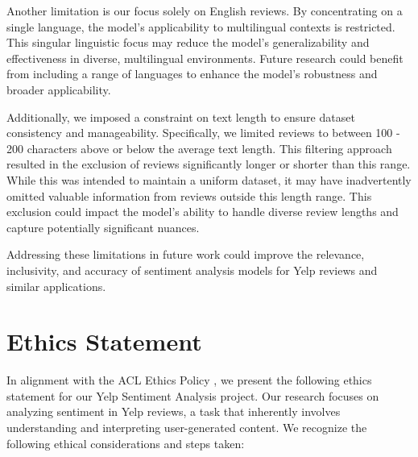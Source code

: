 \documentclass[11pt]{article}
\begin{document}
Another limitation is our focus solely on English reviews. By concentrating on a single language, the model’s applicability to multilingual contexts is restricted. This singular linguistic focus may reduce the model's generalizability and effectiveness in diverse, multilingual environments. Future research could benefit from including a range of languages to enhance the model's robustness and broader applicability.

Additionally, we imposed a constraint on text length to ensure dataset consistency and manageability. Specifically, we limited reviews to between 100 - 200 characters above or below the average text length. This filtering approach resulted in the exclusion of reviews significantly longer or shorter than this range. While this was intended to maintain a uniform dataset, it may have inadvertently omitted valuable information from reviews outside this length range. This exclusion could impact the model’s ability to handle diverse review lengths and capture potentially significant nuances.

Addressing these limitations in future work could improve the relevance, inclusivity, and accuracy of sentiment analysis models for Yelp reviews and similar applications.

\section*{Ethics Statement}

In alignment with the ACL Ethics Policy \citep{acl2023ethics}, we present the following ethics statement for our Yelp Sentiment Analysis project. Our research focuses on analyzing sentiment in Yelp reviews, a task that inherently involves understanding and interpreting user-generated content. We recognize the following ethical considerations and steps taken:
\end{document}
